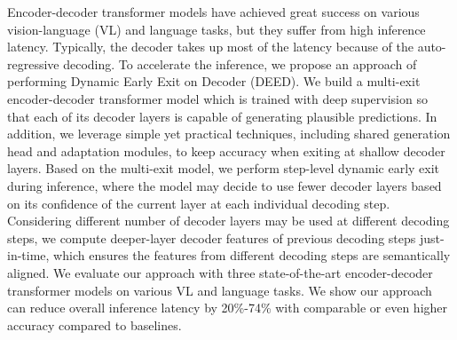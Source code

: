 Encoder-decoder transformer models have achieved great success on various vision-language (VL) and language tasks, but they suffer from high inference latency. Typically, the decoder takes up most of the latency because of the auto-regressive decoding. To accelerate the inference, we propose an approach of performing Dynamic Early Exit on Decoder (DEED). We build a multi-exit encoder-decoder transformer model which is trained with deep supervision so that each of its decoder layers is capable of generating plausible predictions. In addition, we leverage simple yet practical techniques, including shared generation head and adaptation modules, to keep accuracy when exiting at shallow decoder layers. Based on the multi-exit model, we perform step-level dynamic early exit during inference, where the model may decide to use fewer decoder layers based on its confidence of the current layer at each individual decoding step. Considering different number of decoder layers may be used at different decoding steps, we compute deeper-layer decoder features of previous decoding steps just-in-time, which ensures the features from different decoding steps are semantically aligned. We evaluate our approach with three state-of-the-art encoder-decoder transformer models on various VL and language tasks. We show our approach can reduce overall inference latency by 20\%-74\% with comparable or even higher accuracy compared to baselines.